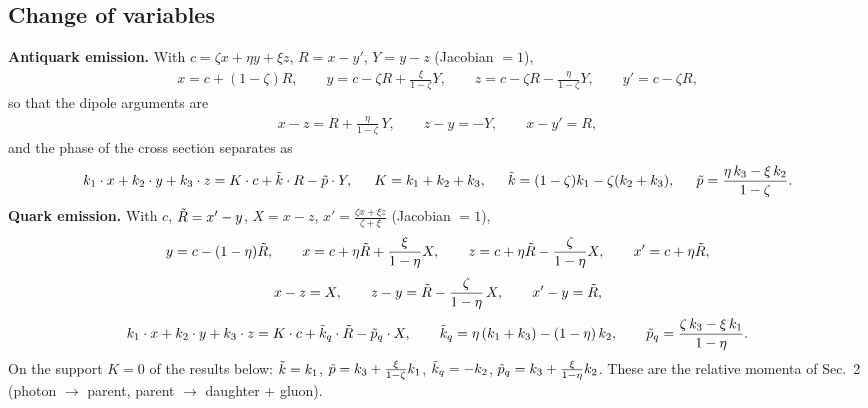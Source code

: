 \documentclass[9pt]{article}
\numberwithin{equation}{section}
\begin{document}
\subsection{Change of variables}
\textbf{Antiquark emission.} With $c=\zeta x+\eta y+\xi z$, $R=x-y'$, $Y=y-z$ (Jacobian $=1$),
\begin{align}
    x = c+(1-\zeta)R,\hspace{2em} y = c-\zeta R+\frac{\xi}{1-\zeta}Y,\hspace{2em} z = c-\zeta R-\frac{\eta}{1-\zeta}Y,\hspace{2em} y' = c-\zeta R,
\end{align}
so that the dipole arguments are
\begin{align}\label{eq:argqb}
    x-z = R+\frac{\eta}{1-\zeta}\,Y,\hspace{2em} z-y=-Y,\hspace{2em} x-y'=R,
\end{align}
and the phase of the cross section separates as
\begin{align}\label{eq:phaseqb}
    k_{1}\cdot x+k_{2}\cdot y+k_{3}\cdot z = K\cdot c+\Tilde{k}\cdot R-\Tilde{p}\cdot Y,\hspace{1.5em} K=k_{1}+k_{2}+k_{3},\hspace{1.5em} \Tilde{k}=(1-\zeta)k_{1}-\zeta(k_{2}+k_{3}),\hspace{1.5em} \Tilde{p}=\frac{\eta\,k_{3}-\xi\,k_{2}}{1-\zeta}.
\end{align}
\textbf{Quark emission.} With $c$, $\Tilde{R}=x'-y$, $X=x-z$, $x'=\frac{\zeta x+\xi z}{\zeta+\xi}$ (Jacobian $=1$),
\begin{align}
    y = c-(1-\eta)\Tilde{R},\hspace{2em} x = c+\eta\Tilde{R}+\frac{\xi}{1-\eta}X,\hspace{2em} z = c+\eta\Tilde{R}-\frac{\zeta}{1-\eta}X,\hspace{2em} x'=c+\eta\Tilde{R},
\end{align}
\begin{align}\label{eq:argq}
    x-z = X,\hspace{2em} z-y = \Tilde{R}-\frac{\zeta}{1-\eta}\,X,\hspace{2em} x'-y=\Tilde{R},
\end{align}
\begin{align}\label{eq:phaseq}
    k_{1}\cdot x+k_{2}\cdot y+k_{3}\cdot z = K\cdot c+\Tilde{k}_{q}\cdot\Tilde{R}-\Tilde{p}_{q}\cdot X,\hspace{2em} \Tilde{k}_{q}=\eta\,(k_{1}+k_{3})-(1-\eta)\,k_{2},\hspace{2em} \Tilde{p}_{q}=\frac{\zeta\,k_{3}-\xi\,k_{1}}{1-\eta}.
\end{align}
On the support $K=0$ of the results below: $\Tilde{k}=k_{1}$, $\Tilde{p}=k_{3}+\frac{\xi}{1-\zeta}k_{1}$, $\Tilde{k}_{q}=-k_{2}$, $\Tilde{p}_{q}=k_{3}+\frac{\xi}{1-\eta}k_{2}$. These are the relative momenta of Sec.~2 (photon $\rightarrow$ parent, parent $\rightarrow$ daughter $+$ gluon).
\end{document}
